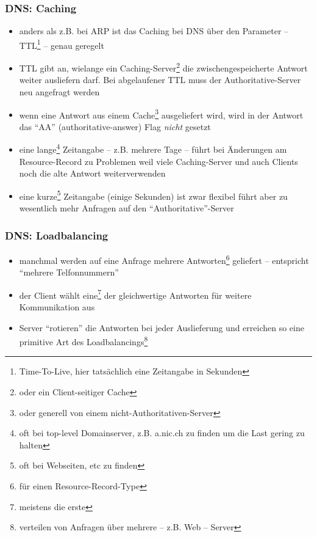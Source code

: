 \documentclass[ignorenonframetext]{beamer}
\begin{document}
\begin{frame}\label{caching}
\frametitle{DNS: Caching}
\begin{itemize}
	\item anders als z.B. bei ARP ist das Caching bei DNS \"uber den Parameter -- TTL\footnote{Time-To-Live, hier tats\"achlich eine Zeitangabe in Sekunden} -- genau geregelt
	\item TTL gibt an, wielange ein Caching-Server\footnote{oder ein Client-seitiger Cache} die zwischengespeicherte Antwort weiter ausliefern darf. Bei abgelaufener
	TTL muss der Authoritative-Server neu angefragt werden
	\item wenn eine Antwort aus einem Cache\footnote{oder generell von einem nicht-Authoritativen-Server} ausgeliefert wird, wird in der Antwort das ``AA'' (authoritative-answer) Flag {\em nicht} gesetzt
	\item eine lange\footnote{oft bei top-level Domainserver, z.B. a.nic.ch zu finden um die Last gering zu halten} Zeitangabe -- z.B. mehrere Tage -- f\"uhrt bei \"Anderungen am Resource-Record zu Problemen weil viele Caching-Server und auch Clients noch die alte Antwort weiterverwenden
	\item eine kurze\footnote{oft bei Webseiten, etc zu finden} Zeitangabe (einige Sekunden) ist zwar flexibel f\"uhrt aber zu wesentlich mehr Anfragen auf den ``Authoritative''-Server
\end{itemize}
\end{frame}


\begin{frame}\label{loadbalancing}
\frametitle{DNS: Loadbalancing}
\begin{itemize}
	\item manchmal werden auf eine Anfrage mehrere Antworten\footnote{f\"ur einen Resource-Record-Type} geliefert -- entspricht ``mehrere Telfonnummern''
	\item der Client w\"ahlt eine\footnote{meistens die erste} der gleichwertige Antworten f\"ur weitere Kommunikation aus
	\item Server ``rotieren'' die Antworten bei jeder Auslieferung und erreichen so eine primitive Art des Loadbalancings\footnote{verteilen von Anfragen \"uber mehrere -- z.B. Web -- Server}
\end{itemize}
\end{frame}
\end{document}

